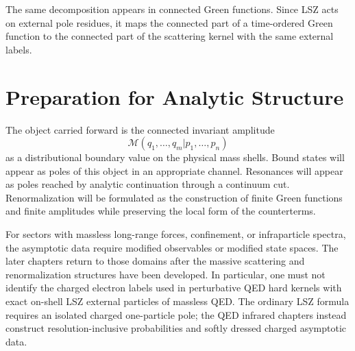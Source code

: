 The same decomposition appears in connected Green functions. Since LSZ acts
on external pole residues, it maps the connected part of a time-ordered Green
function to the connected part of the scattering kernel with the same
external labels.

\section{Preparation for Analytic Structure}

The object carried forward is the connected invariant amplitude
\[
  \mathcal M(q_1,\ldots,q_m|p_1,\ldots,p_n)
\]
as a distributional boundary value on the physical mass shells. Bound states
will appear as poles of this object in an appropriate channel. Resonances will
appear as poles reached by analytic continuation through a continuum cut.
Renormalization will be formulated as the construction of finite Green
functions and finite amplitudes while preserving the local form of the
counterterms.

For sectors with massless long-range forces, confinement, or infraparticle
spectra, the asymptotic data require modified observables or modified state
spaces. The later chapters return to those domains after the massive
scattering and renormalization structures have been developed. In particular,
one must not identify the charged electron labels used in perturbative QED
hard kernels with exact on-shell LSZ external particles of massless QED.  The
ordinary LSZ formula requires an isolated charged one-particle pole; the QED
infrared chapters instead construct resolution-inclusive probabilities and
softly dressed charged asymptotic data.
